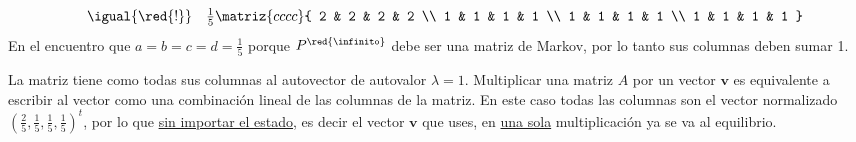 \begin{enumerate}[label=(\alph*)]
$$\begin{array}{rcl}
                        & \igual{\red{!}}   &
            \frac{1}{5}
            \matriz{cccc}{
            2           & 2                 & 2           & 2           \\
            1           & 1                 & 1           & 1           \\
            1           & 1                 & 1           & 1           \\
            1           & 1                 & 1           & 1
            }
          \end{array}
        $$
        En el \red{!!!} encuentro que $a = b = c = d = \frac{1}{5}$ porque $P^{\red{\infinito}}$ debe ser una matriz de Markov, por
        lo tanto sus columnas deben sumar 1.

        La matriz tiene como todas sus columnas al autovector de autovalor $\lambda = 1$. Multiplicar una matriz $A$ por un vector
        $\bm{v}$ es equivalente a escribir al vector como una combinación lineal de las columnas de la matriz. En este caso
        todas las columnas son el vector normalizado $(\frac{2}{5},\frac{1}{5},\frac{1}{5},\frac{1}{5})^t$,
        por lo que \underline{sin importar el estado}, es decir el vector $\bm{v}$ que uses, en \underline{una sola} multiplicación ya
        se va al equilibrio.


\end{enumerate}

\begin{aportes}
  \item {}
  \item {}
\end{aportes}

